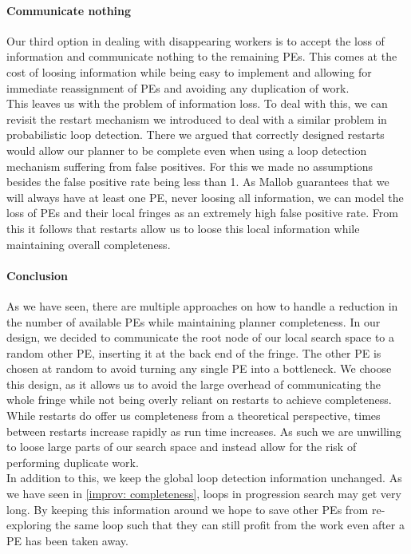 \paragraph{Communicate nothing}
Our third option in dealing with disappearing workers is to accept the loss of information and communicate nothing to the remaining PEs. This comes at the cost of loosing information while being easy to implement and allowing for immediate reassignment of PEs and avoiding any duplication of work. \\
This leaves us with the problem of information loss. To deal with this, we can revisit the restart mechanism we introduced to deal with a similar problem in probabilistic loop detection. There we argued that correctly designed restarts would allow our planner to be complete even when using a loop detection mechanism suffering from false positives. For this we made no assumptions besides the false positive rate being less than 1. As Mallob guarantees that we will always have at least one PE, never loosing all information, we can model the loss of PEs and their local fringes as an extremely high false positive rate. From this it follows that restarts allow us to loose this local information while maintaining overall completeness.

\paragraph{Conclusion}
As we have seen, there are multiple approaches on how to handle a reduction in the number of available PEs while maintaining planner completeness. In our design, we decided to communicate the root node of our local search space to a random other PE, inserting it at the back end of the fringe. The other PE is chosen at random to avoid turning any single PE into a bottleneck. We choose this design, as it allows us to avoid the large overhead of communicating the whole fringe while not being overly reliant on restarts to achieve completeness. While restarts do offer us completeness from a theoretical perspective, times between restarts increase rapidly as run time increases. As such we are unwilling to loose large parts of our search space and instead allow for the risk of performing duplicate work. \\
In addition to this, we keep the global loop detection information unchanged. As we have seen in \ref{improv: completeness}, loops in progression search may get very long. By keeping this information around we hope to save other PEs from re-exploring the same loop such that they can still profit from the work even after a PE has been taken away.
\begin{comment}
- keep the search space around
- restarts offer completeness from a theoretical perspective
- however, in practice it may take a long time
- we are not willing to loose potentially very large parts of our search space
\end{comment}
			
